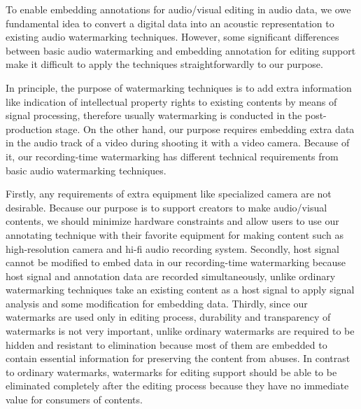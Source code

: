 To enable embedding annotations for audio/visual editing in audio data, we owe fundamental idea to convert a digital data into an acoustic representation to existing audio watermarking techniques.
However, some significant differences between basic audio watermarking and embedding annotation for editing support make it difficult to apply the techniques straightforwardly to our purpose.

In principle, the purpose of watermarking techniques is to add extra information like indication of intellectual property rights to existing contents by means of signal processing, therefore usually watermarking is conducted in the post-production stage.
On the other hand, our purpose requires embedding extra data in the audio track of a video during shooting it with a video camera. %
Because of it, our recording-time watermarking has different technical requirements from basic audio watermarking techniques.

Firstly, any requirements of extra equipment like specialized camera are not desirable.
Because our purpose is to support creators to make audio/visual contents, we should minimize hardware constraints and allow users to use our annotating technique with their favorite equipment for making content such as high-resolution camera and hi-fi audio recording system.
Secondly, host signal cannot be modified to embed data in our recording-time watermarking because host signal and annotation data are recorded simultaneously, unlike ordinary watermarking techniques take an existing content as a host signal to apply signal analysis and some modification for embedding data.
Thirdly, since our watermarks are used only in editing process, durability and transparency of watermarks is not very important, unlike ordinary watermarks are required to be hidden and resistant to elimination because most of them are embedded to contain essential information for preserving the content from abuses.
In contrast to ordinary watermarks, watermarks for editing support should be able to be eliminated completely after the editing process because they have no immediate value for consumers of contents.

